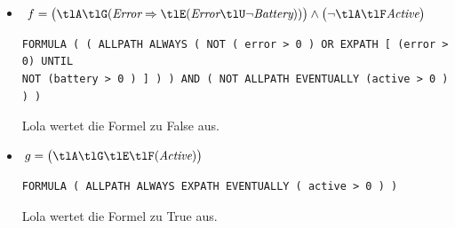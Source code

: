 \documentclass[12pt,a4paper]{../krautsourcing/homework}
\author{Ruben Felgenhauer,\\Alexander Hildebrandt,\\Leonhard Reichenbach}
\newcommand{\eBattery}{\textit{Battery}}
\newcommand{\eActive}{\textit{Active}}
\newcommand{\eError}{\textit{Error}}
\begin{document}
\makeheadline

\addtocounter{section}{2}

\section{}

\subsection{}


\subsection{}

\begin{itemize}
\item
\(\begin{aligned}
f &= \big(\tlA\tlG(\eError \Rightarrow \tlE (\eError \tlU \lnot \eBattery))\big) \land \big(\lnot \tlA \tlF \eActive \big)\\
\end{aligned}\)
\begin{verbatim}
FORMULA ( ( ALLPATH ALWAYS ( NOT ( error > 0 ) OR EXPATH [ (error > 0) UNTIL
NOT (battery > 0 ) ] ) ) AND ( NOT ALLPATH EVENTUALLY (active > 0 ) ) )
\end{verbatim}
Lola wertet die Formel zu False aus.
\item
\(\begin{aligned}
g &= \big ( \tlA \tlG \tlE \tlF (\eActive) \big )
\end{aligned}\)
\begin{verbatim}
FORMULA ( ALLPATH ALWAYS EXPATH EVENTUALLY ( active > 0 ) )
\end{verbatim}
Lola wertet die Formel zu True aus.
\end{itemize}
\end{document}
